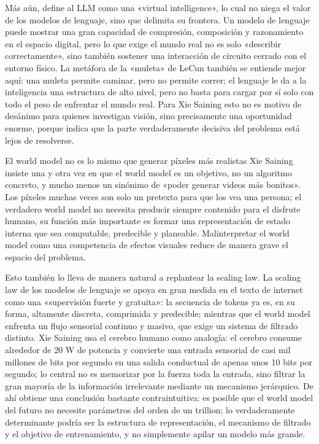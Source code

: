 Más aún, define al LLM como una «virtual intelligence», lo cual no niega el valor de los modelos de lenguaje, sino que delimita su frontera. Un modelo de lenguaje puede mostrar una gran capacidad de compresión, composición y razonamiento en el espacio digital, pero lo que exige el mundo real no es solo «describir correctamente», sino también sostener una interacción de circuito cerrado con el entorno físico. La metáfora de la «muleta» de LeCun también se entiende mejor aquí: una muleta permite caminar, pero no permite correr; el lenguaje le da a la inteligencia una estructura de alto nivel, pero no basta para cargar por sí solo con todo el peso de enfrentar el mundo real. Para Xie Saining esto no es motivo de desánimo para quienes investigan visión, sino precisamente una oportunidad enorme, porque indica que la parte verdaderamente decisiva del problema está lejos de resolverse.

\begin{warningbox}{El world model no es lo mismo que generar píxeles más realistas}
Xie Saining insiste una y otra vez en que el world model es un objetivo, no un algoritmo concreto, y mucho menos un sinónimo de «poder generar videos más bonitos». Los píxeles muchas veces son solo un pretexto para que los vea una persona; el verdadero world model no necesita producir siempre contenido para el disfrute humano, su función más importante es formar una representación de estado interna que sea computable, predecible y planeable. Malinterpretar el world model como una competencia de efectos visuales reduce de manera grave el espacio del problema.
\end{warningbox}

Esto también lo lleva de manera natural a replantear la scaling law. La scaling law de los modelos de lenguaje se apoya en gran medida en el texto de internet como una «supervisión fuerte y gratuita»: la secuencia de tokens ya es, en su forma, altamente discreta, comprimida y predecible; mientras que el world model enfrenta un flujo sensorial continuo y masivo, que exige un sistema de filtrado distinto. Xie Saining usa el cerebro humano como analogía: el cerebro consume alrededor de 20 W de potencia y convierte una entrada sensorial de casi mil millones de bits por segundo en una salida conductual de apenas unos 10 bits por segundo; lo central no es memorizar por la fuerza toda la entrada, sino filtrar la gran mayoría de la información irrelevante mediante un mecanismo jerárquico. De ahí obtiene una conclusión bastante contraintuitiva: es posible que el world model del futuro no necesite parámetros del orden de un trillion; lo verdaderamente determinante podría ser la estructura de representación, el mecanismo de filtrado y el objetivo de entrenamiento, y no simplemente apilar un modelo más grande.

